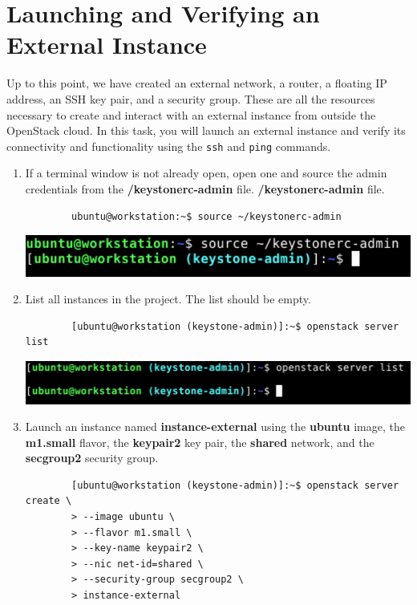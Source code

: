 \documentclass[letterpaper, 12pt]{article}
\begin{document}
\section{Launching and Verifying an External Instance}
\label{sec:launching_an_external_isntance}
Up to this point, we have created an external network, a router, a floating IP address, an SSH key pair, and a security
group. These are all the resources necessary to create and interact with an external instance from outside the OpenStack
cloud. In this task, you will launch an external instance and verify its connectivity and functionality using the
\texttt{ssh} and \texttt{ping} commands.

\begin{enumerate}
    \item If a terminal window is not already open, open one and source the admin credentials from the 
    \textbf{\texttildemid/keystonerc-admin} file.
    \textbf{\texttildemid/keystonerc-admin} file.
    \begin{lstlisting}
        ubuntu@workstation:~$ source ~/keystonerc-admin
    \end{lstlisting}

    \begin{center}
        \includegraphics[width=\linewidth]{images/part6/step1.png}
    \end{center}

    \item List all instances in the project. The list should be empty.
    \begin{lstlisting}
        [ubuntu@workstation (keystone-admin)]:~$ openstack server list
    \end{lstlisting}

    \begin{center}
        \includegraphics[width=\linewidth]{images/part6/step2.png}
    \end{center}

    \item Launch an instance named \textbf{instance-external} using the \textbf{ubuntu} image, the \textbf{m1.small}
    flavor, the \textbf{keypair2} key pair, the \textbf{shared} network, and the \textbf{secgroup2} security
    group.
    \begin{lstlisting}
        [ubuntu@workstation (keystone-admin)]:~$ openstack server create \
        > --image ubuntu \
        > --flavor m1.small \
        > --key-name keypair2 \
        > --nic net-id=shared \
        > --security-group secgroup2 \
        > instance-external
    \end{lstlisting}


\end{enumerate}
\end{document}
